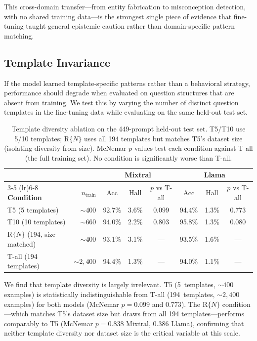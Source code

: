 This cross-domain transfer---from entity fabrication to misconception detection, with no shared training data---is the strongest single piece of evidence that fine-tuning taught general epistemic caution rather than domain-specific pattern matching.

\subsection{Template Invariance}
\label{sec:template-ablation}

If the model learned template-specific patterns rather than a behavioral strategy, performance should degrade when evaluated on question structures that are absent from training. We test this by varying the number of distinct question templates in the fine-tuning data while evaluating on the same held-out test set.

\begin{table}[ht]
\centering
\small
\begin{tabular}{@{}lrcccccc@{}}
\toprule
& & \multicolumn{3}{c}{\textbf{Mixtral}} & \multicolumn{3}{c}{\textbf{Llama}} \\
\cmidrule(lr){3-5} \cmidrule(lr){6-8}
\textbf{Condition} & $n_{\text{train}}$ & Acc & Hall & $p$ vs T-all & Acc & Hall & $p$ vs T-all \\
\midrule
T5 (5 templates) & ${\sim}400$ & 92.7\% & 3.6\% & 0.099 & 94.4\% & 1.3\% & 0.773 \\
T10 (10 templates) & ${\sim}660$ & 94.0\% & 2.2\% & 0.803 & 95.8\% & 1.3\% & 0.080 \\
R$\{N\}$ (194, size-matched) & ${\sim}400$ & 93.1\% & 3.1\% & --- & 93.5\% & 1.6\% & --- \\
T-all (194 templates) & ${\sim}2{,}400$ & 94.4\% & 1.3\% & --- & 94.0\% & 1.1\% & --- \\
\bottomrule
\end{tabular}
\caption{Template diversity ablation on the 449-prompt held-out test set. T5/T10 use 5/10 templates; R$\{N\}$ uses all 194 templates but matches T5's dataset size (isolating diversity from size). McNemar $p$-values test each condition against T-all (the full training set). No condition is significantly worse than T-all.}
\label{tab:template-ablation}
\end{table}

We find that template diversity is largely irrelevant. T5 (5~templates, ${\sim}400$ examples) is statistically indistinguishable from T-all (194~templates, ${\sim}2{,}400$ examples) for both models (McNemar $p = 0.099$ and $0.773$). The R$\{N\}$ condition---which matches T5's dataset size but draws from all 194 templates---performs comparably to T5 (McNemar $p = 0.838$ Mixtral, $0.386$ Llama), confirming that neither template diversity nor dataset size is the critical variable at this scale.

